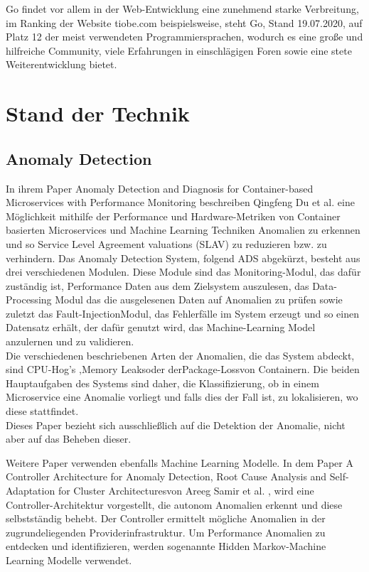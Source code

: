 \documentclass[a4paper,10pt]{scrartcl}
\begin{document}
Go findet vor allem in der Web-Entwicklung eine zunehmend starke Verbreitung, im Ranking der Website tiobe.com beispielsweise, steht Go, Stand 19.07.2020, auf Platz 12 der meist verwendeten Programmiersprachen\cite{.04.07.2020}, wodurch es eine große und hilfreiche Community, viele Erfahrungen in einschlägigen Foren sowie eine stete Weiterentwicklung bietet.\\

\pagebreak

\section{Stand der Technik}

\subsection{Anomaly Detection}
In ihrem Paper \glqq Anomaly Detection and Diagnosis for Container-based Microservices with Performance Monitoring\grqq \cite{.09.07.2020} beschreiben Qingfeng Du et al. eine Möglichkeit mithilfe der Performance und Hardware-Metriken von Container basierten Microservices und Machine Learning Techniken  Anomalien zu erkennen und so Service Level Agreement valuations (SLAV) zu reduzieren bzw. zu verhindern. Das Anomaly Detection System, folgend ADS abgekürzt, besteht aus drei verschiedenen Modulen. Diese Module sind das Monitoring-Modul, das dafür zuständig ist, Performance Daten aus dem Zielsystem auszulesen, das Data-Processing Modul das die ausgelesenen Daten auf Anomalien zu prüfen sowie zuletzt das \glqq Fault-Injection\grqq Modul, das Fehlerfälle im System erzeugt und so einen Datensatz erhält, der dafür genutzt wird, das Machine-Learning Model anzulernen und zu validieren.\\
Die verschiedenen beschriebenen Arten der Anomalien, die das System abdeckt, sind \glqq CPU-Hog's \grqq ,\glqq Memory Leaks\grqq oder der\glqq Package-Loss\grqq von Containern. Die beiden Hauptaufgaben des Systems sind daher, die Klassifizierung, ob in einem Microservice eine Anomalie vorliegt und falls dies der Fall ist, zu lokalisieren, wo diese stattfindet.\\
Dieses Paper bezieht sich ausschließlich auf die Detektion der Anomalie, nicht aber auf das Beheben dieser.

Weitere Paper verwenden ebenfalls Machine Learning Modelle. In dem Paper \glqq A Controller Architecture for Anomaly Detection, Root Cause Analysis and Self-Adaptation for Cluster Architectures\grqq von Areeg Samir et al. \cite{.19.07.2020d} , wird eine Controller-Architektur vorgestellt, die autonom Anomalien erkennt und diese selbstständig behebt. Der Controller ermittelt mögliche Anomalien in der zugrundeliegenden Providerinfrastruktur. Um Performance Anomalien zu entdecken und identifizieren, werden sogenannte \glqq Hidden Markov\grqq -Machine Learning Modelle verwendet.\\
\end{document}
